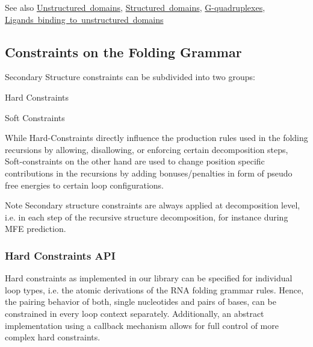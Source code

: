 \begin{DoxySeeAlso}{See also}
\mbox{\hyperlink{group__domains__up}{Unstructured domains}}, \mbox{\hyperlink{group__domains__struc}{Structured domains}}, \mbox{\hyperlink{group__gquads}{G-\/quadruplexes}}, \mbox{\hyperlink{group__ligands__up}{Ligands binding to unstructured domains}}
\end{DoxySeeAlso}
\hypertarget{folding_grammar_sec_constraints}{}\subsection{Constraints on the Folding Grammar}\label{folding_grammar_sec_constraints}
Secondary Structure constraints can be subdivided into two groups\+:


\begin{DoxyItemize}
\item Hard Constraints
\item Soft Constraints
\end{DoxyItemize}

While Hard-\/\+Constraints directly influence the production rules used in the folding recursions by allowing, disallowing, or enforcing certain decomposition steps, Soft-\/constraints on the other hand are used to change position specific contributions in the recursions by adding bonuses/penalties in form of pseudo free energies to certain loop configurations.

\begin{DoxyNote}{Note}
Secondary structure constraints are always applied at decomposition level, i.\+e. in each step of the recursive structure decomposition, for instance during M\+FE prediction.
\end{DoxyNote}
\hypertarget{folding_grammar_sec_constraints_hard_api}{}\subsubsection{Hard Constraints A\+PI}\label{folding_grammar_sec_constraints_hard_api}
Hard constraints as implemented in our library can be specified for individual loop types, i.\+e. the atomic derivations of the R\+NA folding grammar rules. Hence, the pairing behavior of both, single nucleotides and pairs of bases, can be constrained in every loop context separately. Additionally, an abstract implementation using a callback mechanism allows for full control of more complex hard constraints.

